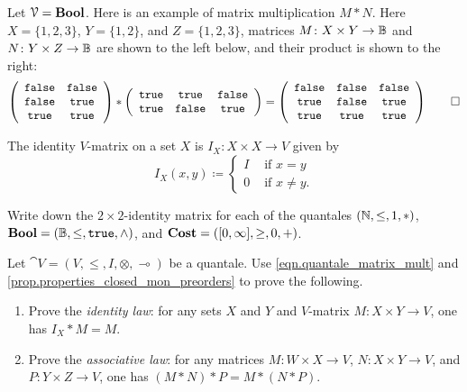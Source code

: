 \documentclass[7Sketches]{subfiles}
\begin{document}
\begin{example}
Let $\mathcal{V}=\mathbf{Bool}$. Here is an example of matrix multiplication $M*N$. Here $X=\{1,2,3\}$, $Y=\{1,2\}$, and $Z=\{1,2,3\}$, matrices $M\colon X\times Y\to\mathbb{B}$ and $N\colon Y\times Z\to\mathbb{B}$ are shown to the left below, and their product is shown to the right:
\[
\left(
\begin{array}{cc}
	\mathtt{false}&\mathtt{false}\\
	\mathtt{false}&\mathtt{true}\\
	\mathtt{true}&\mathtt{true}
\end{array}
\right)
*
\left(
\begin{array}{ccc}
	\mathtt{true}&\mathtt{true}&\mathtt{false}\\
	\mathtt{true}&\mathtt{false}&\mathtt{true}
\end{array}
\right)
=
\left(
\begin{array}{ccc}
	\mathtt{false}&\mathtt{false}&\mathtt{false}\\
	\mathtt{true}&\mathtt{false}&\mathtt{true}\\
	\mathtt{true}&\mathtt{true}&\mathtt{true}
\end{array}
\right)
\qedhere
\]
\end{example}

The identity $V$-matrix on a set $X$ is $I_X\colon X\times X\to V$ given by
\[
	I_X(x,y)\coloneqq
	\begin{cases}
		I&\text{ if }x=y\\
		0&\text{ if }x\neq y.
	\end{cases}
\]%
%

\begin{exercise} %
\label{exc.identity_matrices}
Write down the $2\times 2$-identity matrix for each of the quantales
$(\mathbb{N},\leq,1,*)$, $\mathbf{Bool}=(\mathbb{B},\leq,\mathtt{true},\wedge)$, and
$\mathbf{Cost}=([0,\infty],\geq,0,+)$.
\end{exercise}

\begin{exercise} %
\label{exc.matrix_mult2}
Let $\cat{V}=(V,\leq,I,\otimes,\multimap)$ be a quantale. Use \cref{eqn.quantale_matrix_mult} and \cref{prop.properties_closed_mon_preorders} to prove the following.
\begin{enumerate}
  \item Prove the \emph{identity law}: for any sets $X$ and $Y$ and $V$-matrix $M\colon X\times Y\to V$, one has $I_X*M=M$.
  \item Prove the \emph{associative law}: for any matrices $M\colon W\times X\to V$, $N\colon X\times Y\to V$, and $P\colon Y\times Z\to V$, one has $(M*N)*P=M*(N*P)$.%
\qedhere
\end{enumerate}
\end{exercise}
\end{document}
